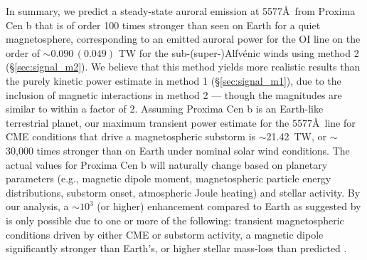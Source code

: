 \documentclass{emulateapj}
\newcommand{\XXX}[1]{#1}      %
\begin{document}
In summary, we predict a steady-state auroral emission at 5577\AA\ from Proxima Cen b that is of order 100 times stronger than seen on Earth for a quiet magnetosphere, corresponding to an emitted auroral power for the OI line on the order of \XXX{${\sim} 0.090\, (0.049)$ TW for the sub-\mbox{(super-)}Alfv\'{e}nic winds using method 2 (\S\ref{sec:signal_m2}). We believe that this method yields more realistic results than the purely kinetic power estimate in method 1 (\S\ref{sec:signal_m1}), due to the inclusion of magnetic interactions in method 2 --- though the magnitudes are similar to within a factor of 2.} Assuming Proxima Cen b is an Earth-like terrestrial planet, our maximum transient power estimate for the 5577\AA\ line for CME conditions that drive a magnetospheric substorm is $\sim$21.42~TW, or ${\sim}$30,000 times stronger than on Earth under nominal solar wind conditions. The actual values for Proxima Cen b will naturally change based on planetary parameters (e.g., magnetic dipole moment, magnetospheric particle energy distributions, substorm onset, atmospheric Joule heating) and stellar activity. By our analysis, a ${\sim} 10^3$ (or higher) enhancement compared to Earth as suggested by \citet{OMalley2016} is only possible due to one or more of the following: transient magnetospheric conditions driven by either CME or substorm activity, a magnetic dipole significantly stronger than Earth's, or higher stellar mass-loss than predicted \citep{Wood2005,Cohen2014}.\\
\\

%
%
% 
 
\end{document}
